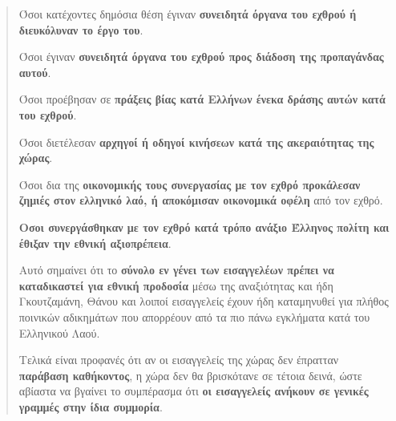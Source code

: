 \documentclass[a4paper]{article}
\begin{document}
\begin{itemize}
\begin{quote}
Όσοι κατέχοντες δημόσια θέση έγιναν \textbf{συνειδητά όργανα του εχθρού ή διευκόλυναν το έργο του}.

Όσοι έγιναν \textbf{συνειδητά όργανα του εχθρού προς διάδοση της προπαγάνδας αυτού}.

Όσοι προέβησαν σε \textbf{πράξεις βίας κατά Ελλήνων ένεκα δράσης αυτών κατά του εχθρού}.

Όσοι διετέλεσαν \textbf{αρχηγοί ή οδηγοί κινήσεων κατά της ακεραιότητας της χώρας}.

Όσοι δια της \textbf{οικονομικής τους συνεργασίας με τον εχθρό προκάλεσαν ζημιές στον ελληνικό λαό, ή αποκόμισαν οικονομικά οφέλη} από τον εχθρό.

\textbf{Οσοι συνεργάσθηκαν με τον εχθρό κατά τρόπο ανάξιο Έλληνος πολίτη και έθιξαν την εθνική αξιοπρέπεια}.

Αυτό σημαίνει ότι το \textbf{σύνολο εν γένει των εισαγγελέων πρέπει να καταδικαστεί για εθνική προδοσία} μέσω της αναξιότητας και ήδη Γκουτζαμάνη, Θάνου και λοιποί εισαγγελείς έχουν ήδη καταμηνυθεί για πλήθος ποινικών αδικημάτων που απορρέουν από τα πιο πάνω εγκλήματα κατά του Ελληνικού Λαού.

Τελικά είναι προφανές ότι αν οι εισαγγελείς της χώρας δεν έπρατταν \textbf{παράβαση καθήκοντος}, η χώρα δεν θα βρισκότανε σε τέτοια δεινά, ώστε αβίαστα να βγαίνει το συμπέρασμα ότι \textbf{οι εισαγγελείς ανήκουν σε γενικές γραμμές στην ίδια συμμορία}.


\end{quote}



\end{itemize}
\end{document}
